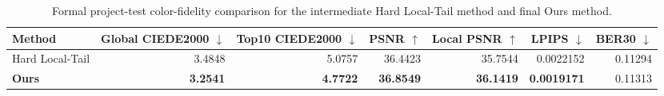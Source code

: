\begin{table}[t]
  \centering
  \caption{Formal project-test color-fidelity comparison for the intermediate Hard Local-Tail method and final Ours method.}
  \label{tab:final_method_color}
  \scriptsize
  \setlength{\tabcolsep}{3pt}
  \begin{tabular}{lrrrrrr}
    \toprule
    Method & Global CIEDE2000 $\downarrow$ & Top10 CIEDE2000 $\downarrow$ & PSNR $\uparrow$ & Local PSNR $\uparrow$ & LPIPS $\downarrow$ & BER30 $\downarrow$ \\
    \midrule
    Hard Local-Tail & 3.4848 & 5.0757 & 36.4423 & 35.7544 & 0.0022152 & 0.11294 \\
    \textbf{Ours} & \textbf{3.2541} & \textbf{4.7722} & \textbf{36.8549} & \textbf{36.1419} & \textbf{0.0019171} & 0.11313 \\
    \bottomrule
  \end{tabular}
\end{table}

